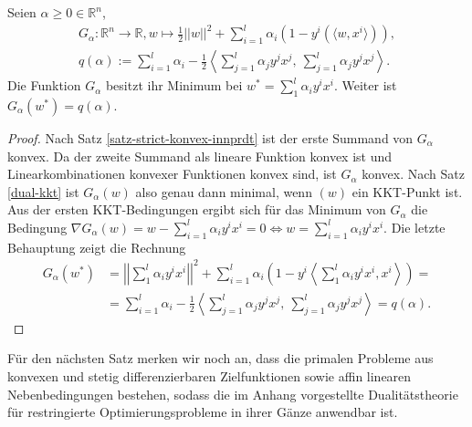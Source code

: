 \begin{lemma}
	Seien $\alpha \geq 0 \in \mathbb{R}^n$,
	\begin{equation}
	\begin{aligned}
	G_{\alpha}: \mathbb{R}^n \rightarrow \mathbb{R}, w \mapsto \frac{1}{2}||w||^2 + \sum_{i=1}^{l} \alpha_i (1- y^i( \langle w, x^i \rangle)), \\
	q(\alpha) := \sum_{i=1}^{l}\alpha_i - \frac{1}{2} \left< \sum_{j=1}^{l} \alpha_j y^j x^j ,\ \sum_{j=1}^{l} \alpha_j y^j x^j \right>.
	\end{aligned}
	\end{equation}Die Funktion $G_\alpha$ besitzt ihr Minimum bei $w^* = \sum_{1}^{l} \alpha_i y^i x^i$. Weiter ist $G_{\alpha}(w^*) = q(\alpha)$.
\end{lemma}
\begin{proof}
	Nach Satz \ref{satz-strict-konvex-innprdt} ist der erste Summand von $G_\alpha$ konvex. Da der zweite Summand als lineare Funktion konvex ist und Linearkombinationen konvexer Funktionen konvex sind, ist $G_\alpha$ konvex. Nach Satz \ref{dual-kkt} ist $G_{\alpha}(w)$  also genau dann minimal, wenn $(w)$ ein KKT-Punkt ist. Aus der ersten KKT-Bedingungen ergibt sich für das Minimum von $G_\alpha$ die Bedingung $\nabla G_\alpha(w) = w - \sum_{i=1}^{l} \alpha_i y^i x^i = 0 \Leftrightarrow w = \sum_{i=1}^{l} \alpha_i y^i x^i$. Die letzte Behauptung zeigt die Rechnung 
	$$
	\begin{aligned}
	G_\alpha(w^*) &= \left | \left |\sum_{1}^{l} \alpha_i y^i x^i \right | \right |^2 +
	\sum_{i=1}^l \alpha_i \left (1-y^i \left \langle \sum_{1}^{l} \alpha_i y^i x^i, x^i \right \rangle \right ) = \\
	&=\sum_{i=1}^{l}\alpha_i - \frac{1}{2} \left< \sum_{j=1}^{l} \alpha_j y^j x^j ,\ \sum_{j=1}^{l} \alpha_j y^j x^j \right> = q(\alpha).
	\end{aligned}
	$$
\end{proof}

Für den nächsten Satz merken wir noch an, dass die primalen Probleme aus konvexen und stetig differenzierbaren Zielfunktionen sowie affin linearen Nebenbedingungen bestehen, sodass die im Anhang vorgestellte Dualitätstheorie für restringierte Optimierungsprobleme in ihrer Gänze anwendbar ist.

